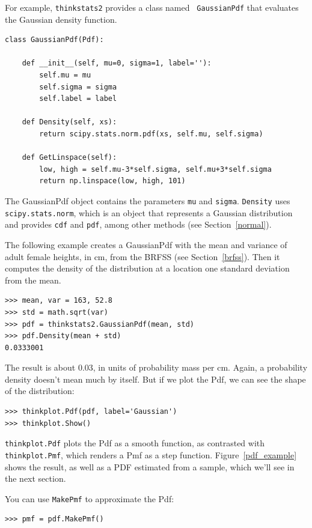 \documentclass[12pt]{book}
\begin{document}
For example, {\tt thinkstats2} provides a class named {\tt
  GaussianPdf} that evaluates the Gaussian density function.

\begin{verbatim}
class GaussianPdf(Pdf):

    def __init__(self, mu=0, sigma=1, label=''):
        self.mu = mu
        self.sigma = sigma
        self.label = label

    def Density(self, xs):
        return scipy.stats.norm.pdf(xs, self.mu, self.sigma)

    def GetLinspace(self):
        low, high = self.mu-3*self.sigma, self.mu+3*self.sigma
        return np.linspace(low, high, 101)
\end{verbatim}

The GaussianPdf object contains the parameters {\tt mu} and
{\tt sigma}.  {\tt Density} uses
{\tt scipy.stats.norm}, which is an object that represents a Gaussian
distribution and provides {\tt cdf} and {\tt pdf}, among other
methods (see Section~\ref{normal}).

The following example creates a GaussianPdf with the mean and variance
of adult female heights, in cm, from the BRFSS (see
Section~\ref{brfss}).  Then it computes the density of the
distribution at a location one standard deviation from the mean.

\begin{verbatim}
>>> mean, var = 163, 52.8
>>> std = math.sqrt(var)
>>> pdf = thinkstats2.GaussianPdf(mean, std)
>>> pdf.Density(mean + std)
0.0333001
\end{verbatim}

The result is about 0.03, in units of probability mass per cm.
Again, a probability density doesn't mean much by itself.  But if
we plot the Pdf, we can see the shape of the distribution:

\begin{verbatim}
>>> thinkplot.Pdf(pdf, label='Gaussian')
>>> thinkplot.Show()
\end{verbatim}

{\tt thinkplot.Pdf} plots the Pdf as a smooth function,
as contrasted with {\tt thinkplot.Pmf}, which renders a Pmf as a
step function.  Figure~\ref{pdf_example} shows the result, as well
as a PDF estimated from a sample, which we'll see in the next
section.

You can use {\tt MakePmf} to approximate the Pdf:

\begin{verbatim}
>>> pmf = pdf.MakePmf()
\end{verbatim}
\end{document}
